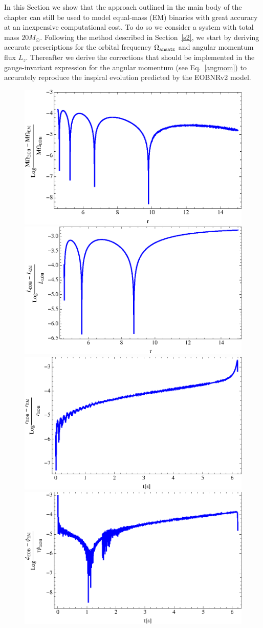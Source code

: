 In this Section we show that the approach outlined in the main body of the chapter can still be used to model equal-mass (EM) binaries with great accuracy at an inexpensive computational cost. To do so we consider a system with total mass \(20 M_{\odot}\). Following the method described in Section~\ref{s2}, we start by deriving accurate prescriptions for the orbital frequency \(\Omega_{\rm ansatz}\) and angular momentum flux \(\dot{L}_z\). Thereafter we derive the corrections that should be implemented in the gauge-invariant expression for the angular momentum (see Eq.~\eqref{angmom}) to accurately reproduce the inspiral evolution predicted by the EOBNRv2 model. 

\begin{figure}[ht]
\includegraphics[height=0.32\textwidth]{figures/insimri/anfreemc}
\includegraphics[height=0.32\textwidth]{figures/insimri/amfemc}
\includegraphics[height=0.32\textwidth,  clip]{figures/insimri/rteobvsemc}
\includegraphics[height=0.32\textwidth,  clip]{figures/insimri/phiteobvsem}

\end{figure}
